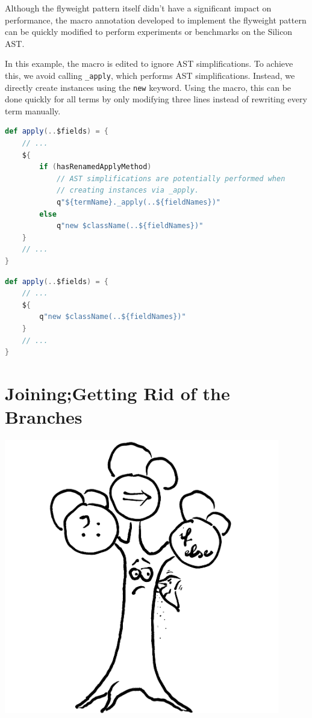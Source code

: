 \documentclass[11pt]{article}
\begin{document}
    Although the flyweight pattern itself didn't have a significant impact on performance,
    the macro annotation developed to implement the flyweight pattern can
    be quickly modified to perform experiments or benchmarks on the Silicon AST.

    In this example, the macro is edited to ignore AST simplifications.
    To achieve this, we avoid calling \texttt{\_apply}, which performs AST simplifications.
    Instead, we directly create instances using the \texttt{new} keyword.
    Using the macro, this can be done quickly for all terms by only modifying three lines
    instead of rewriting every term manually.

    \begin{lstlisting}[language=Scala, caption=Use AST simplifications as normal.]
def apply(..$fields) = {
    // ...
    ${
        if (hasRenamedApplyMethod)
            // AST simplifications are potentially performed when
            // creating instances via _apply.
            q"${termName}._apply(..${fieldNames})"
        else
            q"new $className(..${fieldNames})"
    }
    // ...
}  
    \end{lstlisting}

    \begin{lstlisting}[language=Scala, caption=Modified macro to ignore AST simplifications.]
def apply(..$fields) = {
    // ...
    ${
        q"new $className(..${fieldNames})"
    }
    // ...
}  
    \end{lstlisting}

    \newpage
    \part{Joining;\newline Getting Rid of the Branches}
    \begin{center}
        \vspace{2cm}
        \includegraphics[width=0.9\textwidth]{tree}
    \end{center}
    \newpage
\end{document}
